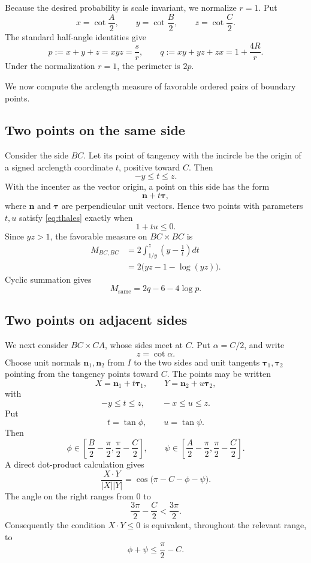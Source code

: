 \documentclass[11pt]{article}
\theoremstyle{definition}
\theoremstyle{remark}
\begin{document}
Because the desired probability is scale invariant, we normalize $r=1$.  Put
\begin{equation}
\label{eq:xyz}
x=\cot\frac A2,
\qquad
y=\cot\frac B2,
\qquad
z=\cot\frac C2.
\end{equation}
The standard half-angle identities give
\begin{equation}
\label{eq:pq}
p:=x+y+z=xyz=\frac sr,
\qquad
q:=xy+yz+zx=1+\frac{4R}{r}.
\end{equation}
Under the normalization $r=1$, the perimeter is $2p$.

We now compute the arclength measure of favorable ordered pairs of boundary points.

\subsection{Two points on the same side}

Consider the side $BC$.  Let its point of tangency with the incircle be the origin of a signed arclength coordinate $t$, positive toward $C$.  Then
\[
-y\le t\le z.
\]
With the incenter as the vector origin, a point on this side has the form
\[
\mathbf n+t\boldsymbol\tau,
\]
where $\mathbf n$ and $\boldsymbol\tau$ are perpendicular unit vectors.  Hence two points with parameters $t,u$ satisfy \eqref{eq:thales} exactly when
\[
1+tu\le0.
\]
Since $yz>1$, the favorable measure on $BC\times BC$ is
\begin{align}
M_{BC,BC}
&=2\int_{1/y}^{z}\left(y-\frac1t\right)dt \\
&=2\bigl(yz-1-\log(yz)\bigr).
\label{eq:sameside}
\end{align}
Cyclic summation gives
\begin{equation}
\label{eq:samesidesum}
M_{\mathrm{same}}
=2q-6-4\log p.
\end{equation}

\subsection{Two points on adjacent sides}

We next consider $BC\times CA$, whose sides meet at $C$.  Put $\alpha=C/2$, and write
\[
z=\cot\alpha.
\]
Choose unit normals $\mathbf n_1,\mathbf n_2$ from $I$ to the two sides and unit tangents $\boldsymbol\tau_1,\boldsymbol\tau_2$ pointing from the tangency points toward $C$.  The points may be written
\[
X=\mathbf n_1+t\boldsymbol\tau_1,
\qquad
Y=\mathbf n_2+u\boldsymbol\tau_2,
\]
with
\[
-y\le t\le z,
\qquad
-x\le u\le z.
\]
Put
\[
t=\tan\phi,
\qquad
u=\tan\psi.
\]
Then
\[
\phi\in\left[\frac B2-\frac\pi2,\frac\pi2-\frac C2\right],
\qquad
\psi\in\left[\frac A2-\frac\pi2,\frac\pi2-\frac C2\right].
\]
A direct dot-product calculation gives
\[
\frac{X\cdot Y}{|X||Y|}
=
\cos\bigl(\pi-C-\phi-\psi\bigr).
\]
The angle on the right ranges from $0$ to
\[
\frac{3\pi}{2}-\frac C2<\frac{3\pi}{2}.
\]
Consequently the condition $X\cdot Y\le0$ is equivalent, throughout the relevant range, to
\begin{equation}
\label{eq:angularcondition}
\phi+\psi\le\frac\pi2-C.
\end{equation}
\end{document}
